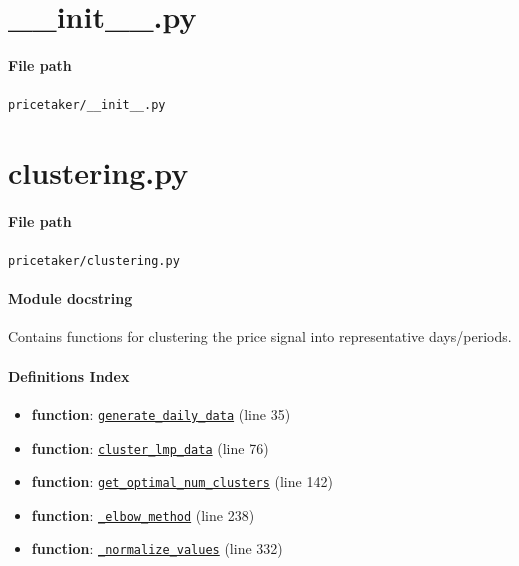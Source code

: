 \documentclass[11pt]{report}
\begin{document}
\section{\_\_init\_\_.py}
\label{file:pricetaker-__init__.py}
\paragraph{File path} \texttt{pricetaker/\_\_init\_\_.py}

\section{clustering.py}
\label{file:pricetaker-clustering.py}
\paragraph{File path} \texttt{pricetaker/clustering.py}
\paragraph{Module docstring} Contains functions for clustering the price signal into representative days/periods.
\paragraph{Definitions Index}
\begin{itemize}[leftmargin=*]
  \item \textbf{function}: \hyperref[def:pricetaker-clustering.py:generate_daily_data:L35]{\texttt{generate\_daily\_data}} (line 35)
  \item \textbf{function}: \hyperref[def:pricetaker-clustering.py:cluster_lmp_data:L76]{\texttt{cluster\_lmp\_data}} (line 76)
  \item \textbf{function}: \hyperref[def:pricetaker-clustering.py:get_optimal_num_clusters:L142]{\texttt{get\_optimal\_num\_clusters}} (line 142)
  \item \textbf{function}: \hyperref[def:pricetaker-clustering.py:_elbow_method:L238]{\texttt{\_elbow\_method}} (line 238)
  \item \textbf{function}: \hyperref[def:pricetaker-clustering.py:_normalize_values:L332]{\texttt{\_normalize\_values}} (line 332)
\end{itemize}
\end{document}
